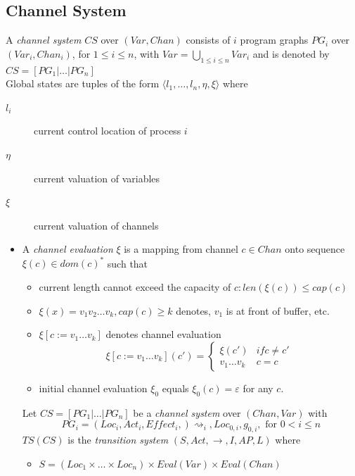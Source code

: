 \documentclass[a4paper, 10pt]{article}
\begin{document}
\subsection*{Channel System}
\begin{shaded}
    A \emph{channel system} $CS$ over $(Var,Chan)$ consists of $i$ program graphs $PG_i$ over $(Var_i,Chan_i)$, for $1\leq i\leq n$, with $Var=\bigcup_{1\leq i\leq n}Var_i$ and is denoted by $CS=[PG_1 | \dots | PG_n ]$ \\
    Global states are tuples of the form $\langle l_1,\dots,l_n,\eta, \xi \rangle$ where
    \begin{description}
        \item[$l_i$] current control location of process $i$
        \item[$\eta$] current valuation of variables
        \item[$\xi$] current valuation of channels
    \end{description}
    \begin{itemize}
        \item A \emph{channel evaluation} $\xi$ is a mapping from channel $c\in Chan$ onto sequence $\xi(c)\in dom(c)^*$ such that
        \begin{itemize}
            \item current length cannot exceed the capacity of $c:len(\xi(c))\leq cap(c)$
            \item $\xi(x)=v_1v_2\dots v_k, cap(c)\geq k$ denotes, $v_1$ is at front of buffer, etc.
            \item $\xi [c:=v_1\dots v_k]$ denotes channel evaluation
            \[ \xi [c:=v_1\dots v_k] (c') =
            \begin{cases}
            \xi(c') & if c \not= c' \\
            v_1\dots v_k & c=c
            \end{cases}
            \]
            \item initial channel evaluation $\xi_0$ equals $\xi_0(c)=\varepsilon$ for any $c$.
        \end{itemize}
        Let $CS=[PG_1 | \dots | PG_n ]$ be a \emph{channel system} over $(Chan,Var)$ with
        \[ PG_i = (Loc_i, Act_i, Effect_i,) \rightsquigarrow_i, Loc_{0,i}, g_{0,i}, \textrm{ for } 0<i\leq n \]
        $TS(CS)$ is the \emph{transition system} $(S,Act,\to,I,AP,L)$ where
        \begin{itemize}
            \item $S=(Loc_1\times\dots\times Loc_n)\times Eval(Var) \times Eval(Chan)$

\end{itemize}
\end{itemize}
\end{shaded}
\end{document}
